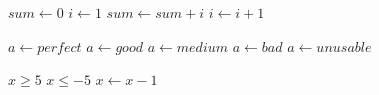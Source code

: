 \documentclass{article}
\begin{document}
\begin{algorithmic}[1]
\State $sum\gets 0$
\State $i\gets 1$
\State $sum\gets sum+i$
 \State $i\gets i+1$
           \EndWhile
\end{algorithmic}

\begin{algorithmic}[1]
 \State $a\gets perfect$
 \State $a\gets good$
 \State $a\gets medium$
             \State $a\gets bad$
  \Else
                 \State $a\gets unusable$
  \EndIf
\end{algorithmic}

\begin{algorithmic}[1]
            \Require $x\ge5$
\Ensure $x\le-5$
             \Statex
{}
                  \State $x\gets x-1$
                                \EndWhile
\end{algorithmic}
\end{document}
